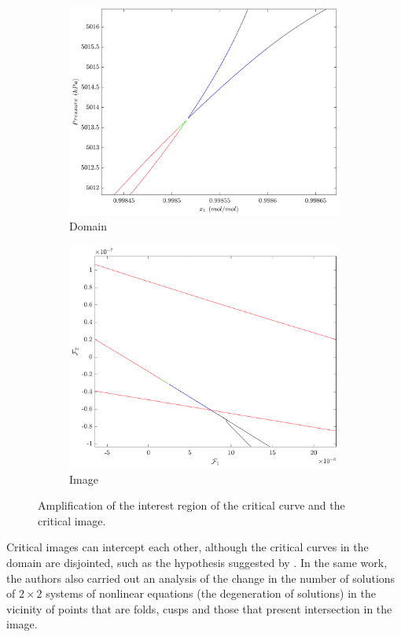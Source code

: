 \documentclass[journal=iecred,manuscript=article]{achemso}
\theoremstyle{definition}
\theoremstyle{remark}
\begin{document}
\begin{figure}
\centering
\begin{subfigure}{.5\textwidth}
  \centering
  \includegraphics[width=.9\linewidth]{bicos_dominio}
  \caption{Domain}
  \label{fig:sub1}
\end{subfigure}%
\begin{subfigure}{.5\textwidth}
  \centering
  \includegraphics[width=.9\linewidth]{bicos_imagem}
  \caption{Image}
  \label{fig:sub2}
\end{subfigure}
\caption{Amplification of the interest region of the critical curve and the critical image.}
\label{fig:domain_image}
\end{figure}

Critical images can intercept each other, although the critical curves in the domain are disjointed, such as the hypothesis suggested by \citet{malta}. In the same work, the authors also carried out an analysis of the change in the number of solutions of $ 2 \times 2 $ systems of nonlinear equations (the degeneration of solutions) in the vicinity of points that are folds, cusps and those that present intersection in the image.
\end{document}
